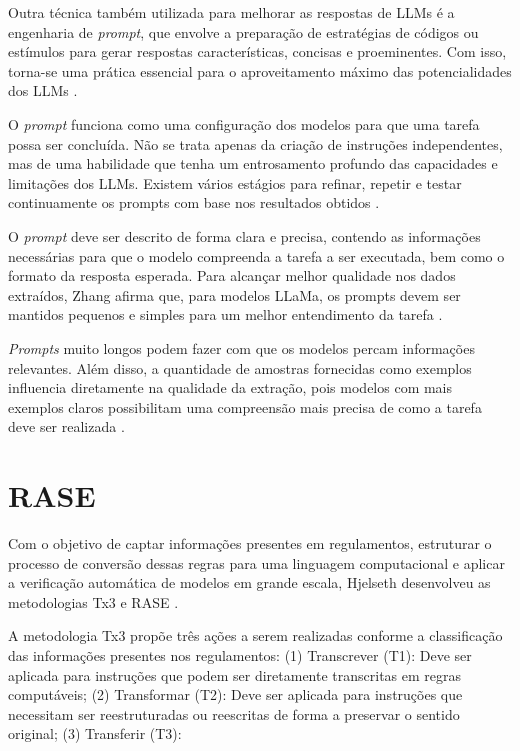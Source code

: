 Outra técnica também utilizada para melhorar as respostas de LLMs é a engenharia de \textit{prompt}, que envolve a preparação de estratégias de códigos ou estímulos para gerar respostas características, concisas e proeminentes. Com isso, torna-se uma prática essencial para o aproveitamento máximo das potencialidades dos LLMs \cite{brown2020}.

O \textit{prompt} funciona como uma configuração dos modelos para que uma tarefa possa ser concluída. Não se trata apenas da criação de instruções independentes, mas de uma habilidade que tenha um entrosamento profundo das capacidades e limitações dos LLMs. Existem vários estágios para refinar, repetir e testar continuamente os prompts com base nos resultados obtidos \cite{nascimento2024}.

O \textit{prompt} deve ser descrito de forma clara e precisa, contendo as informações necessárias para que o modelo compreenda a tarefa a ser executada, bem como o formato da resposta esperada. Para alcançar melhor qualidade nos dados extraídos, Zhang afirma que, para modelos LLaMa, os prompts devem ser mantidos pequenos e simples para um melhor entendimento da tarefa \cite{zhang2024}. 

\textit{Prompts} muito longos podem fazer com que os modelos percam informações relevantes. Além disso, a quantidade de amostras fornecidas como exemplos influencia diretamente na qualidade da extração, pois modelos com mais exemplos claros possibilitam uma compreensão mais precisa de como a tarefa deve ser realizada \cite{zhang2024}.

\section {RASE}

Com o objetivo de captar informações presentes em regulamentos, estruturar o processo de conversão dessas regras para uma linguagem computacional e aplicar a verificação automática de modelos em grande escala, Hjelseth desenvolveu as metodologias Tx3 e RASE \cite{hjelseth2015}. 

A metodologia Tx3 propõe três ações a serem realizadas conforme a classificação das informações presentes nos regulamentos: (1) Transcrever (T1): Deve ser aplicada para instruções que podem ser diretamente transcritas em regras computáveis; (2) Transformar (T2): Deve ser aplicada para instruções que necessitam ser reestruturadas ou reescritas de forma a preservar o sentido original; (3) Transferir (T3): 

